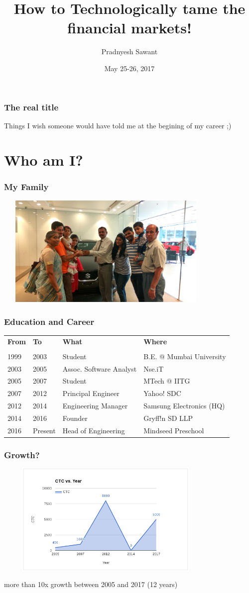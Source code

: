 \documentclass{beamer}
\title{How to Technologically tame the financial markets!}
\author{Pradnyesh Sawant}
\date{May 25-26, 2017}
\begin{document}
\frame{\titlepage}

\begin{frame}
  \frametitle{The real title}
  Things I wish someone would have told me at the begining of my career ;)
\end{frame}

\section{Who am I?}
\begin{frame}
  \frametitle{My Family}
  \includegraphics[height=5.4cm,width=10.8cm]{IMG_20160618_175653_HDR.jpg}
\end{frame}
\begin{frame}
  \frametitle{Education and Career}
  \begin{tabular}{ l  l  l  l }
    \textbf{From} & \textbf{To} & \textbf{What} & \textbf{Where}\\
    & & & \\
    1999 & 2003 & Student & B.E. @ Mumbai University\\
    2003 & 2005 & Assoc. Software Analyst & Nse.iT\\
    2005 & 2007 & Student & MTech @ IITG\\
    2007 & 2012 & Principal Engineer & Yahoo! SDC\\
    2012 & 2014 & Engineering Manager & Samsung Electronics (HQ)\\
    2014 & 2016 & Founder & Gryff!n SD LLP\\
    2016 & Present & Head of Engineering & Mindseed Preschool\\
  \end{tabular}
\end{frame}
\begin{frame}
  \frametitle{Growth?}
  \includegraphics[height=5.4cm,width=10.8cm]{screenshot_2017-05-19_08-08-01.png}

  more than 10x growth between 2005 and 2017 (12 years)
\end{frame}
\end{document}

